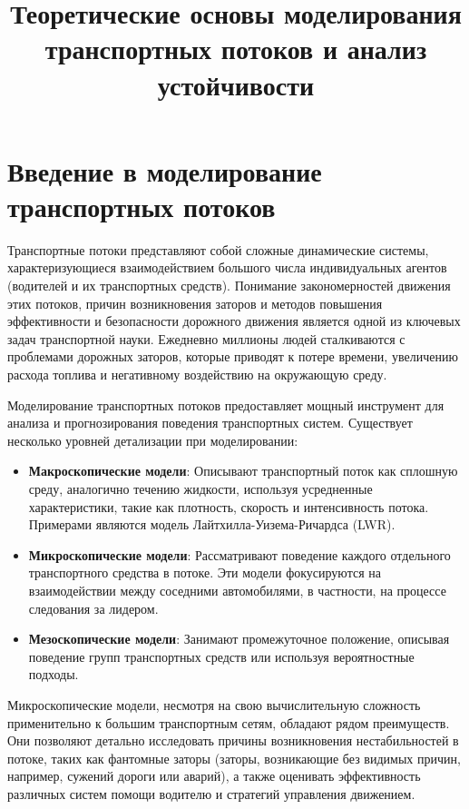 \documentclass[12pt, a4paper]{article}
\title{Теоретические основы моделирования транспортных потоков и анализ устойчивости}
\begin{document}

\section{Введение в моделирование транспортных потоков}
\label{sec:intro_traffic_flow}

Транспортные потоки представляют собой сложные динамические системы, характеризующиеся взаимодействием большого числа индивидуальных агентов (водителей и их транспортных средств). Понимание закономерностей движения этих потоков, причин возникновения заторов и методов повышения эффективности и безопасности дорожного движения является одной из ключевых задач транспортной науки. Ежедневно миллионы людей сталкиваются с проблемами дорожных заторов, которые приводят к потере времени, увеличению расхода топлива и негативному воздействию на окружающую среду.

Моделирование транспортных потоков предоставляет мощный инструмент для анализа и прогнозирования поведения транспортных систем. Существует несколько уровней детализации при моделировании:
\begin{itemize}
    \item \textbf{Макроскопические модели}: Описывают транспортный поток как сплошную среду, аналогично течению жидкости, используя усредненные характеристики, такие как плотность, скорость и интенсивность потока. Примерами являются модель Лайтхилла-Уизема-Ричардса (LWR).
    \item \textbf{Микроскопические модели}: Рассматривают поведение каждого отдельного транспортного средства в потоке. Эти модели фокусируются на взаимодействии между соседними автомобилями, в частности, на процессе следования за лидером.
    \item \textbf{Мезоскопические модели}: Занимают промежуточное положение, описывая поведение групп транспортных средств или используя вероятностные подходы.
\end{itemize}

Микроскопические модели, несмотря на свою вычислительную сложность применительно к большим транспортным сетям, обладают рядом преимуществ. Они позволяют детально исследовать причины возникновения нестабильностей в потоке, таких как фантомные заторы (заторы, возникающие без видимых причин, например, сужений дороги или аварий), а также оценивать эффективность различных систем помощи водителю и стратегий управления движением.
\end{document}
